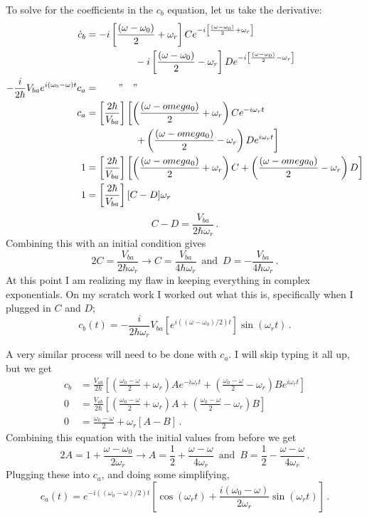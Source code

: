\documentclass[11pt]{article}
\begin{document}
\begin{enumerate}[label=\alph*)]
To solve for the coefficients in the $c_b$ equation, let us take the derivative: 
\begin{align*}
\dot{c}_b & = -i\left[\frac{(\omega - \omega_0)}{2} + \omega_r\right]Ce^{-i\left[\frac{(\omega - \omega_0)}{2} + \omega_r\right]} \\
& \hspace{5em} -i\left[\frac{(\omega - \omega_0)}{2} - \omega_r\right]De^{-i\left[\frac{(\omega - \omega_0)}{2} - \omega_r\right]}\\
-\frac{i}{2\hbar}V_{ba}e^{i(\omega_0-\omega)t}c_a & = \qquad " \quad "\\
c_a & = \left[\frac{2\hbar}{V_{ba}}\right]\left[\left(\frac{(\omega-omega_0)}{2} + \omega_r\right)Ce^{-i\omega_r t} \right. \\
& \hspace{5em } \left. + \left(\frac{(\omega-omega_0)}{2} - \omega_r\right)De^{i\omega_r t}\right]\\
1 & = \left[\frac{2\hbar}{V_{ba}}\right]\left[\left(\frac{(\omega-omega_0)}{2} + \omega_r\right)C + \left(\frac{(\omega-omega_0)}{2} - \omega_r\right)D\right]\\
1 & = \left[\frac{2\hbar}{V_{ba}}\right][C-D]\omega_r
\end{align*}
\[C - D = \frac{V_{ba}}{2\hbar \omega_r} \, .\]
Combining this with an initial condition gives
\[2C = \frac{V_{ba}}{2\hbar \omega_r} \rightarrow C = \frac{V_{ba}}{4\hbar \omega_r} \, \text{ and } \, D = -\frac{V_{ba}}{4\hbar \omega_r} \, .\]
At this point I am realizing my flaw in keeping everything in complex exponentials. On my scratch work I worked out what this is, specifically when I plugged in $C$ and $D$; 
\[c_b(t)  = -\frac{i}{2\hbar \omega_r}V_{ba} \left[e^{i((\omega-\omega_0)/2)t}\right]\sin(\omega_r t) \, .\]

A very similar process will need to be done with $c_a$. I will skip typing it all up, but we get
\begin{align*}
c_b & = \frac{V_{ab}}{2\hbar}\left[\left(\frac{\omega_0 - \omega}{2} + \omega_r\right)Ae^{-i\omega_r t} + \left(\frac{\omega_0 - \omega}{2} - \omega_r\right)Be^{i\omega_r t}\right]\\
0 & = \frac{V_{ab}}{2\hbar}\left[\left(\frac{\omega_0 - \omega}{2} + \omega_r\right)A + \left(\frac{\omega_0 - \omega}{2} - \omega_r\right)B\right]\\
0 & = \frac{\omega_0-\omega}{2}+ \omega_r[A-B] \, .
\end{align*}
Combining this equation with the initial values from before we get
\[2A = 1 + \frac{\omega-\omega_0}{2\omega_r} \rightarrow A = \frac{1}{2} + \frac{\omega-\omega}{4\omega_r} \, \text{ and } \, B = \frac{1}{2} - \frac{\omega-\omega}{4\omega_r} \, .\]
Plugging these into $c_a$, and doing some simplifying,
\[c_a(t) = e^{-i((\omega_0 - \omega)/2)t}\left[\cos(\omega_r t) + \frac{i(\omega_0 - \omega)}{2\omega_r}\sin(\omega_r t)\right] \, .\]


\end{enumerate}
\end{document}

